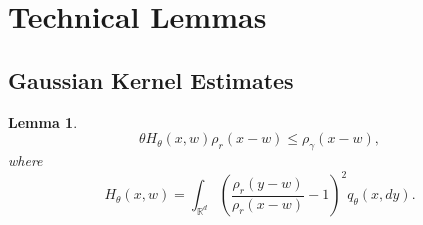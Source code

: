 \documentclass[12pt]{article}
\newtheorem{lemma}[theorem]{Lemma}
\newcommand{\IR}{\mathbb R}
\begin{document}
\newpage


\section{Technical Lemmas}
\subsection{Gaussian Kernel Estimates}

\begin{lemma}\label{eq: Gaussin density estimates}
\begin{equation}
 \theta H_{\theta}(x,w)\rho_r(x-w)\leq \rho_{\gamma}(x-w),
\end{equation}
where
$$H_{\theta}(x,w)=\int_{\IR^d}
    \left(
        \frac{\rho_r(y-w)}{\rho_r(x-w)}
        -
        1
    \right)^2
q_{\theta}(x,dy).$$
\end{lemma}
\end{document}
